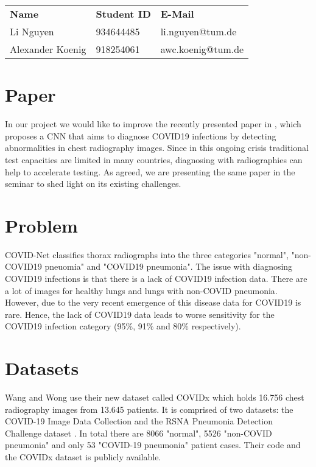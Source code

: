 \documentclass{article}
\begin{document}
\begin{table}[!h]
\center
\begin{tabular}{|l|l|l|}
\hline
\textbf{Name}             & \textbf{Student ID} & \textbf{E-Mail}            \\ \hhline{|=|=|=|}
Li Nguyen        & 934644485  & li.nguyen@tum.de  \\ \hline
Alexander Koenig & 918254061  & awc.koenig@tum.de \\ \hline
\end{tabular}
\end{table}

\begin{multicols}{2}

\section{Paper}
In our project we would like to improve the recently presented paper in \cite{wang2020covid}, which proposes a CNN that aims to diagnose COVID19 infections by detecting abnormalities in chest radiography images. Since in this ongoing crisis traditional test capacities are limited in many countries, diagnosing with radiographies can help to accelerate testing. As agreed, we are presenting the same paper in the seminar to shed light on its existing challenges. 

\section{Problem}
COVID-Net classifies thorax radiographs into the three categories "normal", "non-COVID19 pneuomia" and "COVID19 pneumonia". The issue with diagnosing COVID19 infections is that there is a lack of COVID19 infection data. There are a lot of images for healthy lungs and lungs with non-COVID pneumonia. However, due to the very recent emergence of this disease data for COVID19 is rare. Hence, the lack of COVID19 data leads to worse sensitivity for the COVID19 infection category (95\%, 91\% and 80\% respectively).

\section{Datasets}
Wang and Wong use their new dataset called COVIDx which holds 16.756 chest radiography images from 13.645 patients. It is comprised of two datasets: the COVID-19 Image Data Collection \cite{cohen2020covid} and the RSNA Pneumonia Detection Challenge dataset \cite{RSNA}. In total there are 8066 "normal", 5526 "non-COVID pneumonia" and only 53 "COVID-19 pneumonia" patient cases. Their code and the COVIDx dataset is publicly available.


\end{multicols}
\end{document}
